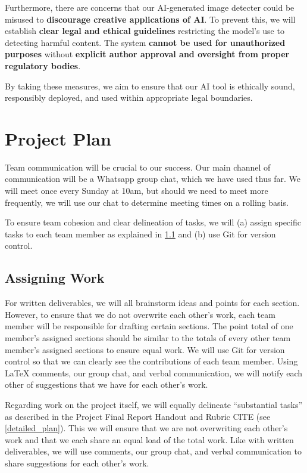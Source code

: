 \documentclass{article} %
\begin{document}
Furthermore, there are concerns that our AI-generated image detecter could be misused to \textbf{discourage creative applications of AI}. To prevent this, we will establish \textbf{clear legal and ethical guidelines} restricting the model’s use to detecting harmful content. The system \textbf{cannot be used for unauthorized purposes} without \textbf{explicit author approval and oversight from proper regulatory bodies}.

By taking these measures, we aim to ensure that our AI tool is ethically sound, responsibly deployed, and used within appropriate legal boundaries.


\section{Project Plan}
\label{plan}

Team communication will be crucial to our success. Our main channel of communication will be a Whatsapp group chat, which we have used thus far. We will meet once every Sunday at 10am, but should we need to meet more frequently, we will use our chat to determine meeting times on a rolling basis.

To ensure team cohesion and clear delineation of tasks, we will (a) assign specific tasks to each team member as explained in \ref{assigning_work} and (b) use Git for version control.

\subsection{Assigning Work}
\label{assigning_work}

For written deliverables, we will all brainstorm ideas and points for each section. However, to ensure that we do not overwrite each other's work, each team member will be responsible for drafting certain sections. The point total of one member's assigned sections should be similar to the totals of every other team member's assigned sections to ensure equal work. We will use Git for version control so that we can clearly see the contributions of each team member. Using LaTeX comments, our group chat, and verbal communication, we will notify each other of suggestions that we have for each other's work.

Regarding work on the project itself, we will equally delineate ``substantial tasks'' as described in the Project Final Report Handout and Rubric CITE (see \ref{detailed_plan}). This we will ensure that we are not overwriting each other's work and that we each share an equal load of the total work. Like with written deliverables, we will use comments, our group chat, and verbal communication to share suggestions for each other's work.
\end{document}
